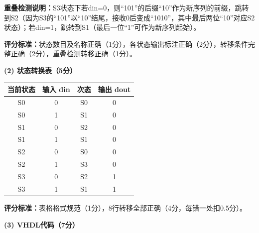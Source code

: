 \textbf{重叠检测说明：}S3状态下若din=0，则“101”的后缀“10”作为新序列的前缀，跳转到S2（因为S3的“101”以“10”结尾，接收0后变成“1010”，其中最后两位“10”对应S2状态）；若din=1，跳转到S1（最后一位“1”可作为新序列起始）。

\textbf{评分标准：}状态数目及名称正确（1分），各状态输出标注正确（2分），转移条件完整正确（2分），重叠检测转移正确（1分）。

\vspace{0.3cm}

\textbf{(2) 状态转换表（5分）}

\begin{center}
\begin{tabular}{|c|c|c|c|}
\hline
\textbf{当前状态} & \textbf{输入 din} & \textbf{次态} & \textbf{输出 dout} \\
\hline
S0 & 0 & S0 & 0 \\
S0 & 1 & S1 & 0 \\
\hline
S1 & 0 & S2 & 0 \\
S1 & 1 & S1 & 0 \\
\hline
S2 & 0 & S0 & 0 \\
S2 & 1 & S3 & 0 \\
\hline
S3 & 0 & S2 & 1 \\
S3 & 1 & S1 & 1 \\
\hline
\end{tabular}
\end{center}

\textbf{评分标准：}表格格式规范（1分），8行转移全部正确（4分，每错一处扣0.5分）。

\vspace{0.3cm}

\textbf{(3) VHDL代码（7分）}

